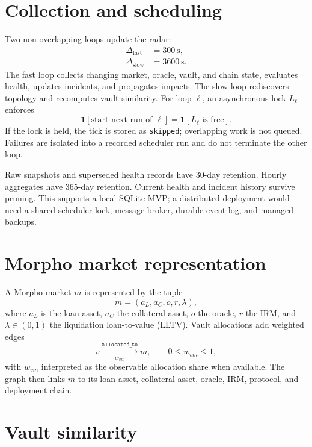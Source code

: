 \documentclass[11pt,a4paper]{article}
\newcommand{\ind}{\mathbf{1}}
\begin{document}
\section{Collection and scheduling}

Two non-overlapping loops update the radar:
\begin{align}
\Delta_{\mathrm{fast}} &= 300\ \mathrm{s},\\
\Delta_{\mathrm{slow}} &= 3600\ \mathrm{s}.
\end{align}
The fast loop collects changing market, oracle, vault, and chain state, evaluates
health, updates incidents, and propagates impacts.  The slow loop rediscovers
topology and recomputes vault similarity.  For loop $\ell$, an asynchronous lock
$L_\ell$ enforces
\begin{equation}
\ind[\text{start next run of }\ell]=\ind[L_\ell\text{ is free}].
\end{equation}
If the lock is held, the tick is stored as \texttt{skipped}; overlapping work is
not queued.  Failures are isolated into a recorded scheduler run and do not
terminate the other loop.

Raw snapshots and superseded health records have 30-day retention.  Hourly
aggregates have 365-day retention.  Current health and incident history survive
pruning.  This supports a local SQLite MVP; a distributed deployment would need
a shared scheduler lock, message broker, durable event log, and managed backups.

\section{Morpho market representation}

A Morpho market $m$ is represented by the tuple
\begin{equation}
m=(a_L,a_C,o,r,\lambda),
\end{equation}
where $a_L$ is the loan asset, $a_C$ the collateral asset, $o$ the oracle, $r$
the IRM, and $\lambda\in(0,1)$ the liquidation loan-to-value (LLTV).  Vault
allocations add weighted edges
\begin{equation}
v \xrightarrow[\ w_{vm}\ ]{\texttt{allocated\_to}} m,
\qquad 0\leq w_{vm}\leq 1,
\end{equation}
with $w_{vm}$ interpreted as the observable allocation share when available.
The graph then links $m$ to its loan asset, collateral asset, oracle, IRM,
protocol, and deployment chain.

\section{Vault similarity}
\end{document}
